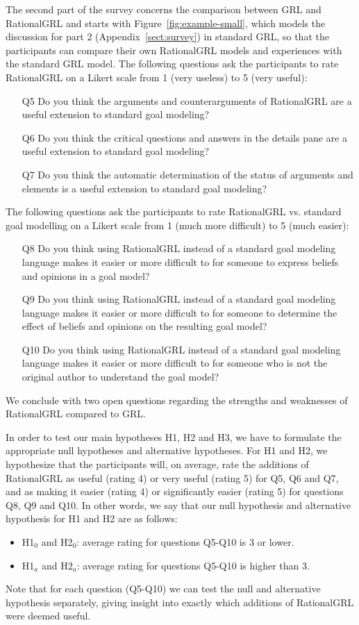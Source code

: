 The second part of the survey concerns the comparison between GRL and RationalGRL and starts with Figure~\ref{fig:example-small}, which models the discussion for part 2 (Appendix~\ref{sect:survey}) in standard GRL, so that the participants can compare their own RationalGRL models and experiences with the standard GRL model. The following questions ask the participants to rate RationalGRL on a Likert scale from 1 (very useless) to 5 (very useful):
\begin{itemize}
\item[Q5] Do you think the arguments and counterarguments of RationalGRL are a useful extension to standard goal modeling?
\item[Q6] Do you think the critical questions and answers in the details pane are a useful extension to standard goal modeling?
\item[Q7] Do you think the automatic determination of the status of arguments and elements is a useful extension to standard goal modeling?
\end{itemize}
The following questions ask the participants to rate RationalGRL vs. standard goal modelling on a Likert scale from 1 (much more difficult) to 5 (much easier):
\begin{itemize}
\item[Q8] Do you think using RationalGRL instead of a standard goal modeling language makes it easier or more difficult to for someone to express beliefs and opinions in a goal model?
\item[Q9] Do you think using RationalGRL instead of a standard goal modeling language makes it easier or more difficult to for someone to determine the effect of beliefs and opinions on the resulting goal model?
\item [Q10] Do you think using RationalGRL instead of a standard goal modeling language makes it easier or more difficult to for someone who is not the original author to understand the goal model? 
\end{itemize}
We conclude with two open questions regarding the strengths and weaknesses of RationalGRL compared to GRL.

In order to test our main hypotheses H1, H2 and H3, we have to formulate the appropriate null hypotheses and alternative hypotheses. For H1 and H2, we hypothesize that the participants will, on average, rate the additions of RationalGRL as useful (rating 4) or very useful (rating 5) for Q5, Q6 and Q7, and as making it easier (rating 4) or significantly easier (rating 5) for questions Q8, Q9 and Q10. In other words, we say that our null hypothesis and alternative hypothesis for H1 and H2 are as follows:
\begin{itemize}
\item H1$_{0}$ and H2$_{0}$: average rating for questions Q5-Q10 is 3 or lower.
\item H1$_{a}$ and H2$_{a}$: average rating for questions Q5-Q10 is higher than 3.
\end{itemize}
Note that for each question (Q5-Q10) we can test the null and alternative hypothesis separately, giving insight into exactly which additions of RationalGRL were deemed useful. 

